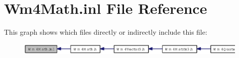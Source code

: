 \section{Wm4Math.inl File Reference}
\label{Wm4Math_8inl}


This graph shows which files directly or indirectly include this file:\begin{figure}[H]
\begin{center}
\leavevmode
\includegraphics[width=397pt]{Wm4Math_8inl__dep__incl}
\end{center}
\end{figure}
